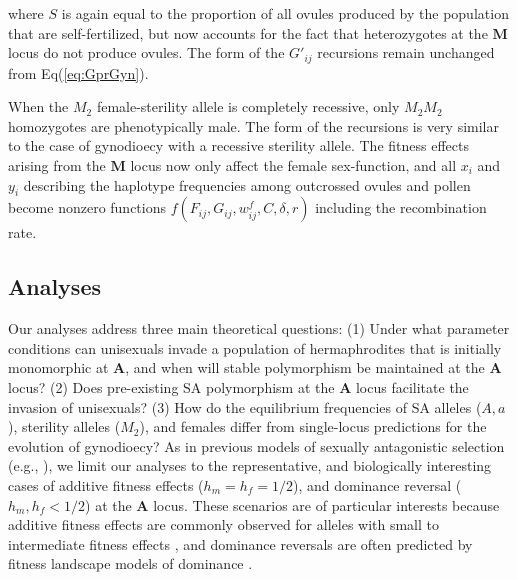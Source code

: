 \documentclass[9pt,twocolumn,twoside,lineno]{gsajnl}
\begin{document}
\noindent where $S$ is again equal to the proportion of all ovules produced by the population that are self-fertilized, but now accounts for the fact that heterozygotes at the $\mathbf{M}$ locus do not produce ovules. The form of the $G'_{ij}$ recursions remain unchanged from Eq(\ref{eq:GprGyn}).

When the $M_2$ female-sterility allele is completely recessive, only $M_2M_2$ homozygotes are phenotypically male. The form of the recursions is very similar to the case of gynodioecy with a recessive sterility allele. The fitness effects arising from the $\mathbf{M}$ locus now only affect the female sex-function, and all $x_i$ and $y_i$ describing the haplotype frequencies among outcrossed ovules and pollen become nonzero functions $f(F_{ij},G_{ij},w^f_{ij},C,\delta,r)$ including the recombination rate.


\subsection{Analyses} \label{subsec:analyses}

Our analyses address three main theoretical questions: (1) Under what parameter conditions can unisexuals invade a population of hermaphrodites that is initially monomorphic at $\mathbf{A}$, and when will stable polymorphism be maintained at the $\mathbf{A}$ locus? (2) Does pre-existing SA polymorphism at the $\mathbf{A}$ locus facilitate the invasion of unisexuals? (3) How do the equilibrium frequencies of SA alleles ($A,a$), sterility alleles ($M_2$), and females differ from single-locus predictions for the evolution of gynodioecy? As in previous models of sexually antagonistic selection (e.g., \citealp{Kidwell1977,Prout2000,JordanConnallon2014}), we limit our analyses to the representative, and biologically interesting cases of additive fitness effects ($h_m = h_f = 1/2$), and dominance reversal ($h_m, h_f < 1/2$) at the $\mathbf{A}$ locus. These scenarios are of particular interests because additive fitness effects are commonly observed for alleles with small to intermediate fitness effects \citep{Agrawal2011}, and dominance reversals are often predicted by fitness landscape models of dominance \citep{Manna2011, ConnallonClark2014}.
\end{document}
